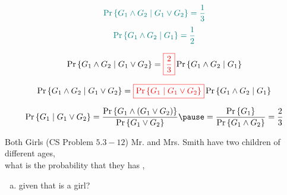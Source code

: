\begin{frame}{}
  \[
    \textcolor{teal}{\Pr\left\{G_1 \land G_2 \mid G_1 \lor G_2\right\} = \frac{1}{3}}
  \]
  \[
    \textcolor{teal}{\Pr\left\{G_1 \land G_2 \mid G_1\right\} = \frac{1}{2}}
  \]

  \pause
  \[
    \Pr\left\{G_1 \land G_2 \mid G_1 \lor G_2\right\} = \textcolor{red}{\boxed{\frac{2}{3}}} \Pr\left\{G_1 \land G_2 \mid G_1\right\}
  \]

  \pause
  \[
    \Pr\left\{G_1 \land G_2 \mid G_1 \lor G_2\right\} = \textcolor{red}{\boxed{\Pr\left\{G_1 \mid G_1 \lor G_2\right\}}} \Pr\left\{G_1 \land G_2 \mid G_1\right\}
  \]

  \pause
  \[
    \Pr\set{G_1 \mid G_1 \lor G_2} = \frac{\Pr\set{G_1 \land (G_1 \lor G_2)}}{\Pr\set{G_1 \lor G_2}} 
    \pause = \frac{\Pr\set{G_1}}{\Pr\set{G_1 \land G_2}} = \frac{2}{3}
  \]
\end{frame}

\begin{frame}{}

  \pause
\end{frame}

\begin{frame}{}
  \begin{exampleblock}{Both Girls (CS Problem $5.3-12$)}
    Mr. and Mrs. Smith have two children of different ages,\\
    what is the probability that they has ,
    \begin{enumerate}[(a)]
      \item given that  is a girl?
    \end{enumerate}
  \end{exampleblock}

  \pause
  \vspace{0.50cm}
  \centerline{}
\end{frame}

